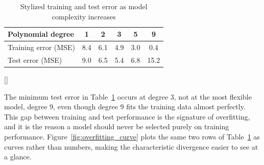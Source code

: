 \documentclass[../ai_in_finance]{subfiles}
\begin{document}
\begin{table}[htbp]
\centering
\begin{lrbox}{\bookmeasuredbox}
\begin{tabular}{lccccc}
\toprule
Polynomial degree & 1 & 2 & 3 & 5 & 9 \\
\midrule
Training error (MSE) & 8.4 & 6.1 & 4.9 & 3.0 & 0.4 \\
Test error (MSE)     & 9.0 & 6.5 & 5.4 & 6.8 & 15.2 \\
\bottomrule
\end{tabular}
\end{lrbox}
\ifdim\wd\bookmeasuredbox<0.65\linewidth
\setlength{\bookcapwidth}{0.65\linewidth}
\else
\setlength{\bookcapwidth}{\wd\bookmeasuredbox}
\fi
{}[\bookcapwidth]{
\usebox{\bookmeasuredbox}
}{
\caption{Stylized training and test error as model complexity increases}
\label{tab:overfitting_stylized}
}
\end{table}

The minimum test error in Table~\ref{tab:overfitting_stylized} occurs at degree 3, not at the most flexible model, degree 9, even though degree 9 fits the training data almost perfectly. This gap between training and test performance is the signature of overfitting, and it is the reason a model should never be selected purely on training performance. Figure~\ref{fig:overfitting_curve} plots the same two rows of Table~\ref{tab:overfitting_stylized} as curves rather than numbers, making the characteristic divergence easier to see at a glance.
\end{document}
